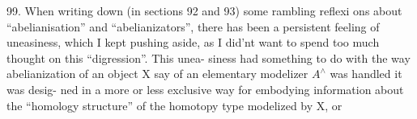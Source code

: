 99. When writing down (in sections 92 and 93) some rambling reflexi
ons about ``abelianisation'' and ``abelianizators'', there has been a
persistent feeling of uneasiness, which I kept pushing aside, as I
did'nt want to spend too much thought on this ``digression''. This unea-%
siness  had  something to do with the way abelianization \hand{(}of an
object X say of an elementary modelizer $A^{\wedge}$\hand{)} was handled\hand{,}  it was desig-%
ned in a more or less exclusive way for embodying information about
the ``homology structure'' of the homotopy type modelized by X, or

